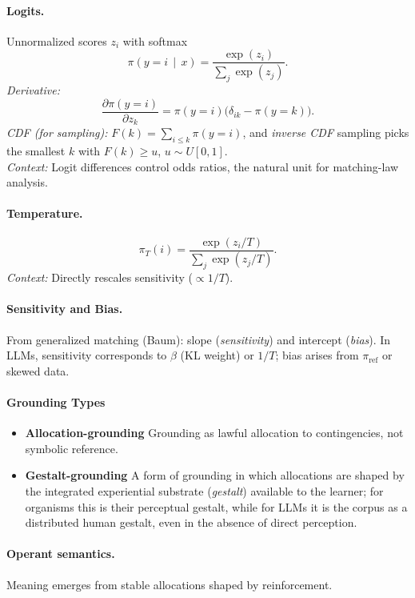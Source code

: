 \documentclass[11pt]{article}
\newcommand{\given}{\,\mid\,}
\begin{document}
\paragraph{Logits.}
Unnormalized scores $z_i$ with softmax
\[
\pi(y=i\given x)=\frac{\exp(z_i)}{\sum_j \exp(z_j)}.
\]
\emph{Derivative:}
\[
\frac{\partial \pi(y=i)}{\partial z_k}=\pi(y=i)\big(\delta_{ik}-\pi(y=k)\big).
\]
\emph{CDF (for sampling):} $F(k)=\sum_{i\le k}\pi(y=i)$, and \emph{inverse CDF} sampling picks the smallest $k$ with $F(k)\ge u$, $u\sim U[0,1]$.\\
\emph{Context:} Logit differences control odds ratios, the natural unit for matching-law analysis.

\paragraph{Temperature.}
\[
\pi_T(i)=\frac{\exp(z_i/T)}{\sum_j \exp(z_j/T)}.
\]
\emph{Context:} Directly rescales sensitivity ($\propto 1/T$).

\paragraph{Sensitivity and Bias.}
From generalized matching (Baum): slope (\emph{sensitivity}) and intercept (\emph{bias}). In LLMs, sensitivity corresponds to $\beta$ (KL weight) or $1/T$; bias arises from $\pi_{\mathrm{ref}}$ or skewed data.

\paragraph{Grounding Types}
\begin{itemize}
\item \textbf{Allocation-grounding}
Grounding as lawful allocation to contingencies, not symbolic reference.  

\item \textbf{Gestalt-grounding} A form of grounding in which allocations are shaped by the integrated experiential substrate (\emph{gestalt}) available to the learner; for organisms this is their perceptual gestalt, while for LLMs it is the corpus as a distributed human gestalt, even in the absence of direct perception.
\end{itemize}

\paragraph{Operant semantics.}
Meaning emerges from stable allocations shaped by reinforcement.  
\end{document}
